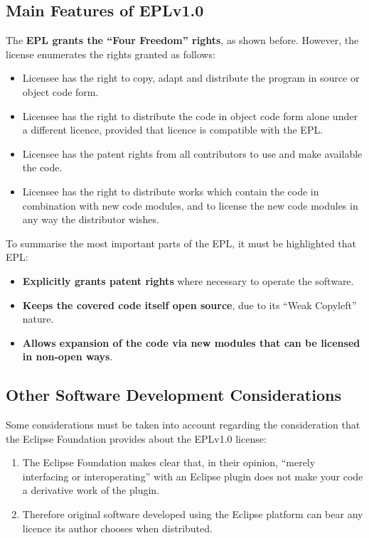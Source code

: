 \documentclass[a4paper, 12pt]{book}
\begin{document}
\subsection{Main Features of EPLv1.0}
The \textbf{EPL grants the ``Four Freedom'' rights}, as shown before. However, the license enumerates the rights granted as follows:
\begin{itemize}\itemsep0pt
 \item{Licensee has the right to copy, adapt and distribute the program in source or object code form}.
 \item{Licensee has the right to distribute the code in object code form alone under a different licence, provided that licence is compatible with the EPL}.
 \item{Licensee has the patent rights from all contributors to use and make available the code}.
  \item{Licensee has the right to distribute works which contain the code in combination with new code modules, and to license the new code modules in any way the distributor wishes}.
\end{itemize}

To summarise the most important parts of the EPL, it must be highlighted that EPL:
\begin{itemize}\itemsep0pt
 \item{\textbf{Explicitly grants patent rights} where necessary to operate the software}.
 \item{\textbf{Keeps the covered code itself open source}}, due to its ``Weak Copyleft'' nature.
 \item{\textbf{Allows expansion of the code via new modules that can be licensed in non-open ways}}.
\end{itemize}\itemsep0pt

\subsection{Other Software Development Considerations}
Some considerations must be taken into account regarding the consideration that the Eclipse Foundation provides about the EPLv1.0 license:
\begin{enumerate}
 \item{The Eclipse Foundation makes clear that, in their opinion, ``merely interfacing or interoperating'' with an Eclipse plugin does not make your code a derivative work of the plugin}.
 \item{Therefore original software developed using the Eclipse platform can bear any licence its author chooses when distributed}.
\end{enumerate}
\end{document}
